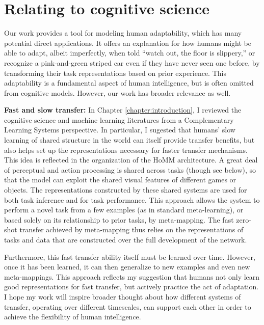 \section{Relating to cognitive science}

Our work provides a tool for modeling human adaptability, which has many potential direct applications. It offers an explanation for how humans might be able to adapt, albeit imperfectly, when told ``watch out, the floor is slippery,'' or recognize a pink-and-green striped car even if they have never seen one before, by transforming their task representations based on prior experience. This adaptability is a fundamental aspect of human intelligence, but is often omitted from cognitive models. However, our work has broader relevance as well. \par 

\textbf{Fast and slow transfer:} In Chapter \ref{chapter:introduction}, I reviewed the cognitive science and machine learning literatures from a Complementary Learning Systems perspective. In particular, I sugested that humans' slow learning of shared structure in the world can itself provide transfer benefits, but also helps set up the representations necessary for faster transfer mechanisms. This idea is reflected in the organization of the HoMM architecture. A great deal of perceptual and action processing is shared across tasks (though see below), so that the model can exploit the shared visual features of different games or objects. The representations constructed by these shared systems are used for both task inference and for task performance. This approach allows the system to perform a novel task from a few examples (as in standard meta-learning), or based solely on its relationship to prior tasks, by meta-mapping. The fast zero-shot transfer achieved by meta-mapping thus relies on the representations of tasks and data that are constructed over the full development of the network. \par

Furthermore, this fast transfer ability itself must be learned over time. However, once it has been learned, it can then generalize to new examples and even new meta-mappings. This approach reflects my suggestion that humans not only learn good representations for fast transfer, but actively practice the act of adaptation. I hope my work will inspire broader thought about how different systems of transfer, operating over different timescales, can support each other in order to achieve the flexibility of human intelligence.\par

